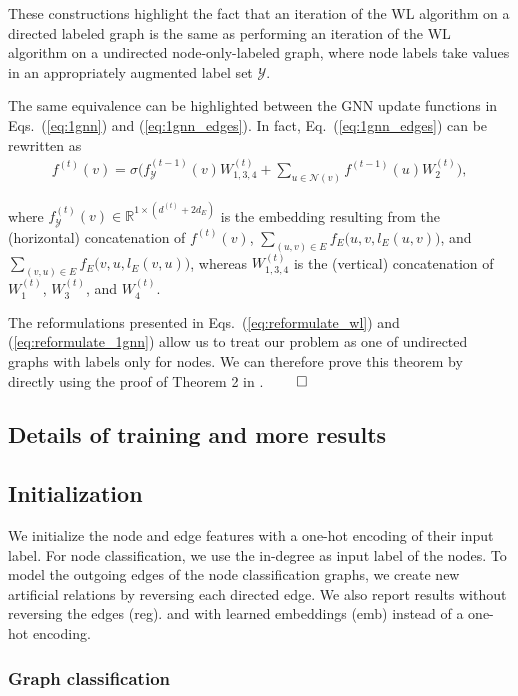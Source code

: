 \documentclass{article} \usepackage{iclr2019_conference,times}
\begin{document}
These constructions highlight the fact that an iteration of the WL algorithm on a directed labeled graph is the same as performing an iteration of the WL algorithm on a undirected node-only-labeled graph, where node labels take values in an appropriately augmented label set $\mathcal{Y}$.

The same equivalence can be highlighted between the GNN update functions in Eqs.~(\ref{eq:1gnn}) and (\ref{eq:1gnn_edges}). In fact, Eq.~(\ref{eq:1gnn_edges}) can be rewritten as 
\begin{align}\label{eq:reformulate_1gnn}
    f^{(t)}(v) = \sigma\Big(f_\mathcal{Y}^{(t-1)}(v)W_{1,3,4}^{(t)} + \sum_{u \in \mathcal{N}(v)}f^{(t-1)}(u)W_2^{(t)}\Big),
\end{align}

where $f_\mathcal{Y}^{(t)}(v) \in \mathbb{R}^{1 \times (d^{(t)} + 2d_E)}$ is the embedding resulting from the (horizontal) concatenation of $f^{(t)}(v)$, $\sum_{(u,v) \in E}f_E\big(u,v, l_E(u,v)\big)$, and $\sum_{(v,u) \in E}f_E\big(v,u, l_E(v,u)\big)$, whereas $W_{1,3,4}^{(t)}$ is the (vertical) concatenation of $W_{1}^{(t)}$, $W_{3}^{(t)}$, and $W_{4}^{(t)}$.

The reformulations presented in Eqs.~(\ref{eq:reformulate_wl}) and  (\ref{eq:reformulate_1gnn}) allow us to treat our problem as one of undirected graphs with labels only for nodes. We can therefore prove this theorem by directly using the proof of Theorem 2 in \cite{Morris2018}. $\qed$

\subsection{Details of training and more results}

\subsection{Initialization}

We initialize the node and edge features with a one-hot encoding of their input label. For node classification, we use the in-degree as input label of the nodes. To model the outgoing edges of the node classification graphs, we create new artificial relations by reversing each directed edge. We also report results without reversing the edges (reg). and with learned embeddings (emb) instead of a one-hot encoding.

\subsubsection{Graph classification}
\end{document}

